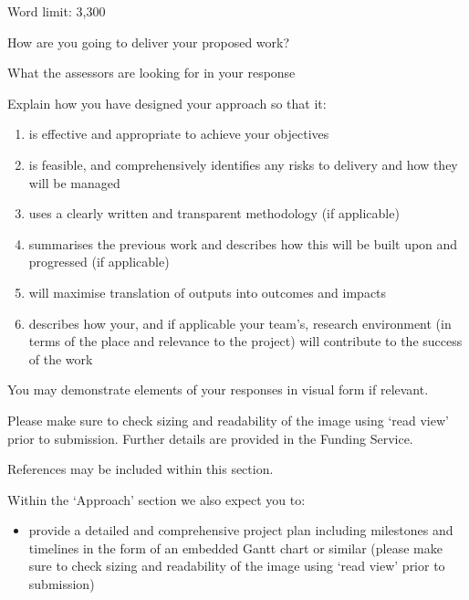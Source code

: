 \documentclass[12pt]{article}
\newenvironment{instruction}{\par\color{red}}{\par}
\begin{document}
\begin{instruction}

Word limit: 3,300

How are you going to deliver your proposed work?

What the assessors are looking for in your response

Explain how you have designed your approach so that it:

\begin{enumerate}

    \item is effective and appropriate to achieve your objectives

    \item is feasible, and comprehensively identifies any risks to delivery and
    how they will be managed

    \item uses a clearly written and transparent methodology (if applicable)

    \item summarises the previous work and describes how this will be built
    upon and progressed (if applicable)

    \item will maximise translation of outputs into outcomes and impacts

    \item describes how your, and if applicable your team’s, research
    environment (in terms of the place and relevance to the project) will
    contribute to the success of the work

\end{enumerate}

You may demonstrate elements of your responses in visual form if relevant.

Please make sure to check sizing and readability of the image using ‘read view’
prior to submission. Further details are provided in the Funding Service.

References may be included within this section.

Within the ‘Approach’ section we also expect you to:

\begin{itemize}

    \item provide a detailed and comprehensive project plan including
    milestones and timelines in the form of an embedded Gantt chart or similar
    (please make sure to check sizing and readability of the image using ‘read
    view’ prior to submission)


\end{itemize}
\end{instruction}
\end{document}
